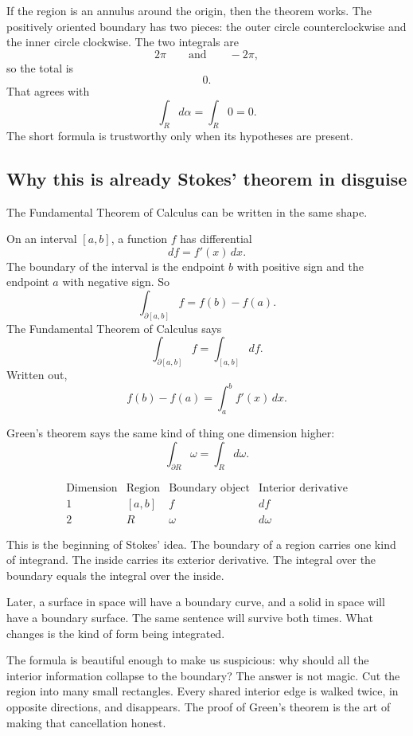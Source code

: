 If the region is an annulus around the origin, then the theorem works.  The positively
oriented boundary has two pieces: the outer circle counterclockwise and the inner
circle clockwise.  The two integrals are
\[
    2\pi
    \qquad\text{and}\qquad
    -2\pi,
\]
so the total is
\[
    0.
\]
That agrees with
\[
    \int_R d\alpha=\int_R 0=0.
\]
The short formula is trustworthy only when its hypotheses are present.

\subsection{Why this is already Stokes' theorem in disguise}

The Fundamental Theorem of Calculus can be written in the same shape.

On an interval \([a,b]\), a function \(f\) has differential
\[
    df=f'(x)\,dx.
\]
The boundary of the interval is the endpoint \(b\) with positive sign and the endpoint
\(a\) with negative sign.  So
\[
    \int_{\partial [a,b]} f=f(b)-f(a).
\]
The Fundamental Theorem of Calculus says
\[
\boxed{
    \int_{\partial [a,b]} f
    =
    \int_{[a,b]} df.
}
\]
Written out,
\[
    f(b)-f(a)
    =
    \int_a^b f'(x)\,dx.
\]

Green's theorem says the same kind of thing one dimension higher:
\[
\boxed{
    \int_{\partial R}\omega
    =
    \int_R d\omega.
}
\]

\[
\begin{array}{c|c|c|c}
\text{Dimension} & \text{Region} & \text{Boundary object} & \text{Interior derivative}\\ \hline
1 & [a,b] & f & df\\[1mm]
2 & R & \omega & d\omega
\end{array}
\]

This is the beginning of Stokes' idea.  The boundary of a region carries one kind of
integrand.  The inside carries its exterior derivative.  The integral over the boundary
equals the integral over the inside.

Later, a surface in space will have a boundary curve, and a solid in space will have a
boundary surface.  The same sentence will survive both times.  What changes is the
kind of form being integrated.

The formula is beautiful enough to make us suspicious: why should all the interior
information collapse to the boundary?  The answer is not magic.  Cut the region into
many small rectangles.  Every shared interior edge is walked twice, in opposite
directions, and disappears.  The proof of Green's theorem is the art of making that
cancellation honest.
